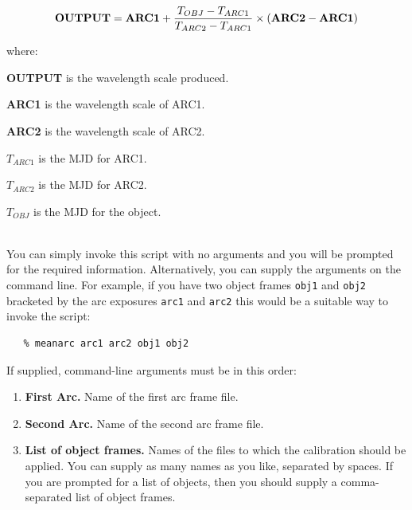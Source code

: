 \documentclass[twoside,11pt]{article}
\renewcommand{\_}{\texttt{\symbol{95}}}
\begin{document}
\begin{description}
\begin{displaymath}
   {\bf{OUTPUT}} = {\bf{ARC1}} + \frac{T_{OBJ} - T_{ARC1}}
                   {T_{ARC2} - T_{ARC1}} \times
                   ({\bf{ARC2}} - {\bf{ARC1}})
\end{displaymath}

     where:

\begin{description}

\item {\bf OUTPUT} is the wavelength scale produced.
\item {\bf ARC1}   is the wavelength scale of ARC1.
\item {\bf ARC2}   is the wavelength scale of ARC2.
\item $T_{ARC1}$  is the MJD for ARC1.
\item $T_{ARC2}$  is the MJD for ARC2.
\item $T_{OBJ}$   is the MJD for the object.

\end{description}

\item [{\bf Usage:}] \mbox{} \\
     You can simply invoke this script with no arguments and you
     will be prompted for the required information.  Alternatively,
     you can supply the arguments on the command line.  For example,
     if you have two object frames \verb+obj1+ and \verb+obj2+ bracketed
     by the arc exposures \verb+arc1+ and \verb+arc2+ this would be a
     suitable way to invoke the script:

\begin{verbatim}
   % meanarc arc1 arc2 obj1 obj2
\end{verbatim}

     If supplied, command-line arguments must be in this order:

\begin{enumerate}

\item {\bf First Arc.}
      Name of the first arc frame file.

\item {\bf Second Arc.}
      Name of the second arc frame file.

\item {\bf List of object frames.}
      Names of the files to which the calibration should be applied.
      You can supply as many names as you like, separated by spaces.
      If you are prompted for a list of objects, then you should
      supply a comma-separated list of object frames.


\end{enumerate}
\end{description}
\end{document}
